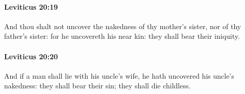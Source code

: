 		\paragraph{Leviticus 20:19} %
			\label{LEVITICUS-20-19}

			And thou shalt not uncover the nakedness of thy mother’s sister, nor of thy father’s sister: for he uncovereth his near kin: they shall bear their iniquity.


		\paragraph{Leviticus 20:20} %
			\label{LEVITICUS-20-20}

			And if a man shall lie with his uncle’s wife, he hath uncovered his uncle’s nakedness: they shall bear their sin; they shall die childless.



